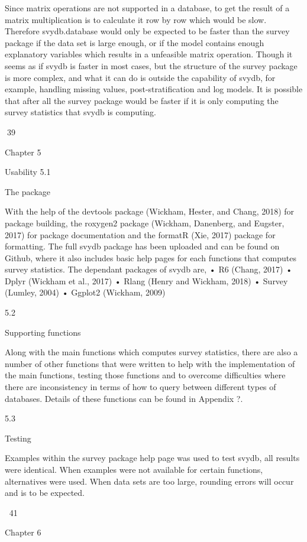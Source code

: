 Since matrix operations are not supported in a database, to get the result of a matrix multiplication is to calculate it row by row which would be slow. Therefore
svydb.database would only be expected to be faster than the survey package if
the data set is large enough, or if the model contains enough explanatory variables
which results in a unfeasible matrix operation.
Though it seems as if svydb is faster in most cases, but the structure of the survey
package is more complex, and what it can do is outside the capability of svydb, for
example, handling missing values, post-stratification and log models. It is possible
that after all the survey package would be faster if it is only computing the survey
statistics that svydb is computing.

39

Chapter 5

Usability
5.1

The package

With the help of the devtools package (Wickham, Hester, and Chang, 2018) for package building, the roxygen2 package (Wickham, Danenberg, and Eugster, 2017) for
package documentation and the formatR (Xie, 2017) package for formatting. The
full svydb package has been uploaded and can be found on Github, where it also
includes basic help pages for each functions that computes survey statistics.
The dependant packages of svydb are,
• R6 (Chang, 2017)
• Dplyr (Wickham et al., 2017)
• Rlang (Henry and Wickham, 2018)
• Survey (Lumley, 2004)
• Ggplot2 (Wickham, 2009)

5.2

Supporting functions

Along with the main functions which computes survey statistics, there are also a
number of other functions that were written to help with the implementation of the
main functions, testing those functions and to overcome difficulties where there are
inconsistency in terms of how to query between different types of databases. Details
of these functions can be found in Appendix ?.

5.3

Testing

Examples within the survey package help page was used to test svydb, all results
were identical. When examples were not available for certain functions, alternatives
were used. When data sets are too large, rounding errors will occur and is to be
expected.

41

Chapter 6

